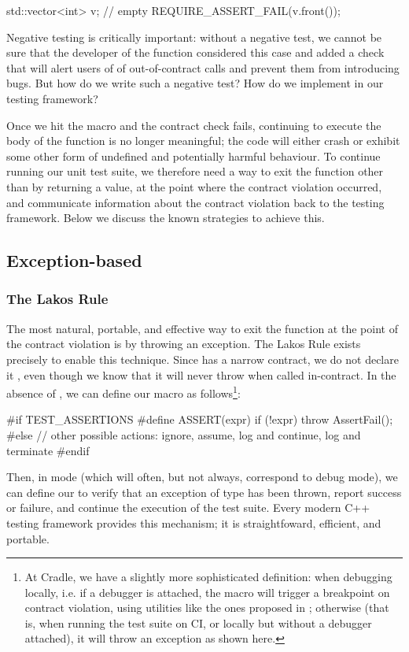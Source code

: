\begin{codeblock}
std::vector<int> v;  // empty
REQUIRE_ASSERT_FAIL(v.front());
\end{codeblock}
Negative testing is critically important: without a negative test, we cannot be sure that the developer of the  function considered this case and added a check that will alert users of  of out-of-contract calls and prevent them from introducing bugs.
But how do we write such a negative test? How do we implement  in our testing framework?

Once we hit the  macro and the contract check fails, continuing to execute the body of the function is no longer meaningful; the code will either crash or exhibit some other form of undefined and potentially harmful behaviour. To continue running our unit test suite, we therefore need a way to exit the function other than by returning a value, at the point where the contract violation occurred, and communicate information about the contract violation back to the testing framework. Below we discuss the known strategies to achieve this.

\subsection{Exception-based}

\subsubsection{The Lakos Rule}

The most natural, portable, and effective way to exit the function at the point of the contract violation is by throwing an exception. The Lakos Rule exists precisely to enable this technique. Since  has a narrow contract, we do not declare it , even though we know that it will never throw when called in-contract. In the absence of , we can define our  macro as follows\footnote{At Cradle, we have a slightly more sophisticated definition: when debugging locally, i.e. if a debugger is attached, the  macro will trigger a breakpoint on contract violation, using utilities like the ones proposed in \cite{P2514R0}; otherwise (that is, when running the test suite on CI, or locally but without a debugger attached), it will throw an  exception as shown here.}:
\begin{codeblock}
#if TEST_ASSERTIONS
  #define ASSERT(expr) if (!expr) throw AssertFail();
#else
  // other possible actions: ignore, assume, log and continue, log and terminate
#endif
\end{codeblock}
Then, in  mode (which will often, but not always, correspond to debug mode), we can define our  to verify that an exception of type  has been thrown, report success or failure, and continue the execution of the test suite. Every modern C++ testing framework provides this mechanism; it is straightfoward, efficient, and portable.


